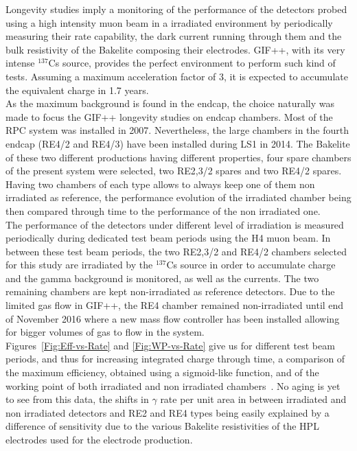     Longevity studies imply a monitoring of the performance of the detectors probed using a high intensity muon beam in a irradiated environment by periodically measuring their rate capability, the dark current running through them and the bulk resistivity of the Bakelite composing their electrodes. GIF++, with its very intense $^{137}$Cs source, provides the perfect environment to perform such kind of tests. Assuming a maximum acceleration factor of 3, it is expected to accumulate the equivalent charge in 1.7 years.\\
    As the maximum background is found in the endcap, the choice naturally was made to focus the GIF++ longevity studies on endcap chambers. Most of the RPC system was installed in 2007. Nevertheless, the large chambers in the fourth endcap (RE4/2 and RE4/3) have been installed during LS1 in 2014. The Bakelite of these two different productions having different properties, four spare chambers of the present system were selected, two RE2,3/2 spares and two RE4/2 spares. Having two chambers of each type allows to always keep one of them non irradiated as reference, the performance evolution of the irradiated chamber being then compared through time to the performance of the non irradiated one.\\
    The performance of the detectors under different level of irradiation is measured periodically during dedicated test beam periods using the H4 muon beam. In between these test beam periods, the two RE2,3/2 and RE4/2 chambers selected for this study are irradiated by the $^{137}$Cs source in order to accumulate charge and the gamma background is monitored, as well as the currents. The two remaining chambers are kept non-irradiated as reference detectors. Due to the limited gas flow in GIF++, the RE4 chamber remained non-irradiated until end of November 2016 where a new mass flow controller has been installed allowing for bigger volumes of gas to flow in the system.\\
     Figures~\ref{Fig:Eff-vs-Rate} and \ref{Fig:WP-vs-Rate} give us for different test beam periods, and thus for increasing integrated charge through time, a comparison of the maximum efficiency, obtained using a sigmoid-like function, and of the working point of both irradiated and non irradiated chambers~\cite{ABBRESCIA2005}. No aging is yet to see from this data, the shifts in $\gamma$ rate per unit area  in between irradiated and non irradiated detectors and RE2 and RE4 types being easily explained by a difference of sensitivity due to the various Bakelite resistivities of the HPL electrodes used for the electrode production.\\
